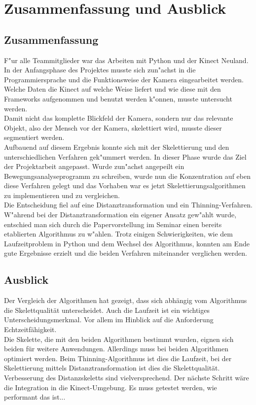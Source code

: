 \chapter{Zusammenfassung und Ausblick}
\label{ch:ausblick}
\section{Zusammenfassung}
F"ur alle Teammitglieder war das Arbeiten mit Python und der Kinect Neuland. In der Anfangsphase des Projektes musste sich zun"achst in die Programmiersprache und die Funktionsweise der Kamera eingearbeitet werden. Welche Daten die Kinect auf welche Weise liefert und wie diese mit den Frameworks aufgenommen und benutzt werden k"onnen, musste untersucht werden.\\
Damit nicht das komplette Blickfeld der Kamera, sondern nur das relevante Objekt, also der Mensch vor der Kamera, skelettiert wird, musste dieser segmentiert werden.\\Aufbauend auf diesem Ergebnis konnte sich mit der Skelettierung und den unterschiedlichen Verfahren gek"ummert werden. In dieser Phase wurde das Ziel der Projektarbeit angepasst. Wurde zun"achst angepeilt ein Bewegungsanalyseprogramm zu schreiben, wurde nun die Konzentration auf eben diese Verfahren gelegt und das Vorhaben war es jetzt Skelettierungsalgorithmen zu implementieren und zu vergleichen.\\Die Entscheidung fiel auf eine Distanztransformation und ein Thinning-Verfahren. W"ahrend bei der Distanztransformation ein eigener Ansatz gew"ahlt wurde, entschied man sich durch die Papervorstellung im Seminar einen bereits etablierten Algorithmus zu w"ahlen. Trotz einigen Schwierigkeiten, wie dem Laufzeitproblem in Python und dem Wechsel des Algorithmus, konnten am Ende gute Ergebnisse erzielt und die beiden Verfahren miteinander verglichen werden.
\section{Ausblick}
Der Vergleich der Algorithmen hat gezeigt, dass sich abhängig vom Algorithmus die Skelettqualität unterscheidet. Auch die 
Laufzeit ist ein wichtiges Unterscheidungsmerkmal. Vor allem im Hinblick auf die Anforderung Echtzeitfähigkeit.\\
Die Skelette, die mit den beiden Algorithmen bestimmt wurden, eignen sich beiden für weitere Anwendungen. Allerdings muss bei beiden Algorithmen optimiert werden. Beim Thinning-Algorithmus ist dies die Laufzeit, bei der Skelettierung mittels Distanztransformation ist dies die Skelettqualität. Verbesserung des Distanzskeletts sind vielversprechend. Der nächste Schritt wäre die Integration in die Kinect-Umgebung. Es muss
getestet werden, wie performant das ist...\\